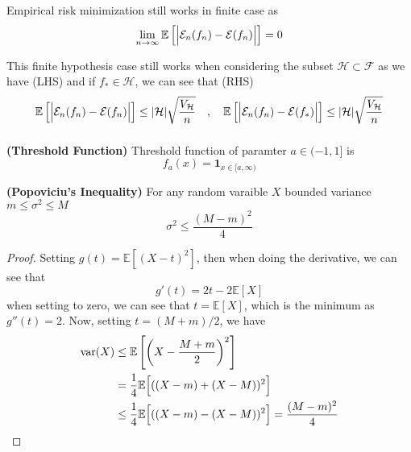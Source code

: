 \begin{remark}
    Empirical risk minimization still works in finite case as 
    \begin{equation*}
        \lim_{n\rightarrow\infty}\mathbb{E}\left[ \Big| \mathcal{E}_n(f_n) - \mathcal{E}(f_n) \Big| \right] = 0
    \end{equation*}
\end{remark}

\begin{remark}
    This finite hypothesis case still works when considering the subset $\mathcal{H}\subset\mathcal{F}$ as we have (LHS) and if $f_*\in\mathcal{H}$, we can see that (RHS)
    \begin{equation*}
        \mathbb{E}\left[ \Big| \mathcal{E}_n(f_n) - \mathcal{E}(f_n) \Big| \right] \le |\mathcal{H}|\sqrt{\frac{V_\mathcal{H}}{n}}
        \quad,\quad \mathbb{E}\left[ \Big| \mathcal{E}_n(f_n) - \mathcal{E}(f_*) \Big| \right] \le |\mathcal{H}|\sqrt{\frac{V_\mathcal{H}}{n}}
    \end{equation*}
    \begin{equation*}
    \end{equation*}
\end{remark}

\begin{definition}{\textbf{(Threshold Function)}}
    Threshold function of paramter $a\in(-1, 1]$ is 
    \begin{equation*}
        f_a(x) = \boldsymbol 1_{x\in[a, \infty)}
    \end{equation*}
\end{definition}

\begin{theorem}{\textbf{(Popoviciu's Inequality)}}
    For any random varaible $X$ bounded variance $m\le\sigma^2 \le M$
    \begin{equation*}
        \sigma^2 \le \frac{(M-m)^2}{4}
    \end{equation*}
\end{theorem}
\begin{proof}
    Setting $g(t) = \mathbb{E}[(X-t)^2]$, then when doing the derivative, we can see that 
    \begin{equation*}
        g'(t) = 2t-2\mathbb{E}[X]
    \end{equation*}
    when setting to zero, we can see that $t = \mathbb{E}[X]$, which is the minimum as $g''(t) = 2$. Now, setting $t = (M+m)/2$, we have 
    \begin{equation*}
    \begin{aligned}
        \operatorname{var}(X) &\le \mathbb{E}\left[ \left( X - \frac{M+m}{2} \right)^2 \right] \\
        &=\frac{1}{4}\mathbb{E}\Big[((X-m)+(X-M))^2\Big] \\
        &\le\frac{1}{4}\mathbb{E}\Big[((X-m)-(X-M))^2\Big] =\frac{(M-m)^2}{4}
    \end{aligned}
    \end{equation*}
\end{proof}

